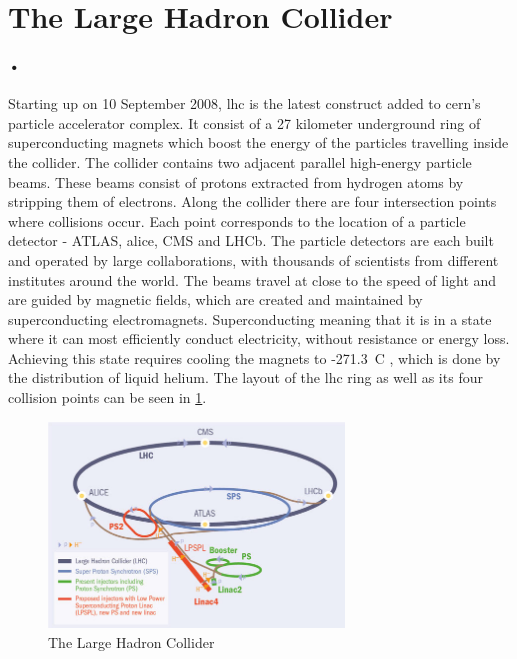 \documentclass[a4paper, 12pt]{report}\dfrac{\right }{•}
\begin{document}
\section{The Large Hadron Collider}
\label{sec:lhc}
\paragraph{•}
Starting up on 10 September 2008, \gls{lhc} is the latest construct added to \gls{cern}'s particle accelerator complex\cite{lhc}.
It consist of a 27 kilometer underground ring of superconducting magnets which boost the energy of the particles travelling inside the collider.
The collider contains two adjacent parallel high-energy particle beams.
These beams consist of protons extracted from hydrogen atoms by stripping them of electrons.
Along the collider there are four intersection points where collisions occur.
Each point corresponds to the location of a particle detector - ATLAS, \gls{alice}, CMS and LHCb.
The particle detectors are each built and operated by large collaborations, with thousands of scientists from different institutes around the world.
The beams travel at close to the speed of light and are guided by magnetic fields, which are created and maintained by superconducting electromagnets.
Superconducting meaning that it is in a state where it can most efficiently conduct electricity, without resistance or energy loss.
Achieving this state requires cooling the magnets to -271.3\degree~C , which is done by the distribution of liquid helium.
The layout of the \gls{lhc} ring as well as its four collision points can be seen in \ref{fig:lhc}.

\begin{figure}[h!]
  \centering
    \includegraphics[width=0.7\textwidth]{images/lhc-ring.jpg}
     \caption[The Large Hadron Collider]{The Large Hadron Collider \cite{lhc-ring-image}}
    \label{fig:lhc}
\end{figure}
\end{document}
